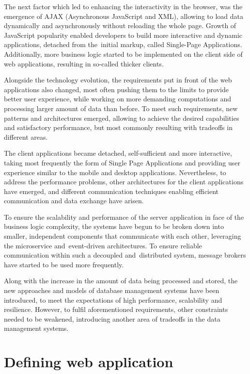 The next factor which led to enhancing the interactivity in the browser, was the emergence of AJAX (Asynchronous JavaScript and XML), allowing to load data dynamically and asynchronously without reloading the whole page. Growth of JavaScript popularity enabled developers to build more interactive and dynamic applications, detached from the~initial markup, called Single-Page Applications. Additionally, more business logic started to be implemented on the client side of web applications, resulting in so-called thicker clients.

Alongside the technology evolution, the requirements put in front of the web applications also changed, most often pushing them to the limits to provide better user experience, while working on more demanding computations and processing larger amount of data than before. To meet such requirements, new patterns and architectures emerged, allowing to achieve the desired capabilities and satisfactory performance, but most commonly resulting with tradeoffs in different areas.

The client applications became detached, self-sufficient and more interactive, taking most frequently the form of Single Page Applications and providing user experience similar to the mobile and desktop applications. Nevertheless, to address the performance problems, other architectures for the client applications have emerged, and different communication techniques enabling efficient communication and data exchange have arisen.

To ensure the scalability and performance of the server application in face of the business logic complexity, the systems have begun to be broken down into smaller, independent components that communicate with each other, leveraging the microservice and~event-driven architectures. To ensure reliable communication within such a decoupled and~distributed system, message brokers have started to be used more frequently.

Along with the increase in the amount of data being processed and stored, the new approaches and models of database management systems have been introduced, to meet the expectations of high performance, scalability and resilience. However, to fulfil aforementioned requirements, other constraints needed to be weakened, introducing another area of tradeoffs in the data management systems.

\section{Defining web application} \label{chapter:web-apps-definition}

